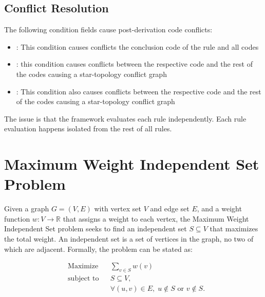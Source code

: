 \subsection{Conflict Resolution}

The following condition fields cause post-derivation code conflicts:
\begin{itemize}
    \item {}: This condition causes conflicts the conclusion code of the rule and all codes
    \item {}: this condition causes conflicts between the respective code and the rest of the codes causing a star-topology conflict graph
    \item {}: This condition also causes conflicts between the respective code and the rest of the codes causing a star-topology conflict graph
\end{itemize}

The issue is that the framework evaluates each rule independently.
Each rule evaluation happens isolated from the rest of all rules.


\section*{Maximum Weight Independent Set Problem}

Given a graph $G = (V, E)$ with vertex set $V$ and edge set $E$, and a weight function $w: V \rightarrow \mathbb{R}$ that assigns a weight to each vertex, the Maximum Weight Independent Set problem seeks to find an independent set $S \subseteq V$ that maximizes the total weight. An independent set is a set of vertices in the graph, no two of which are adjacent. Formally, the problem can be stated as:

\begin{equation}
    \begin{aligned}
        & \text{Maximize}
        & & \sum_{v \in S} w(v) \\
        & \text{subject to}
        & & S \subseteq V, \\
        &&& \forall (u, v) \in E, \; u \notin S \text{ or } v \notin S.
    \end{aligned}
\end{equation}



